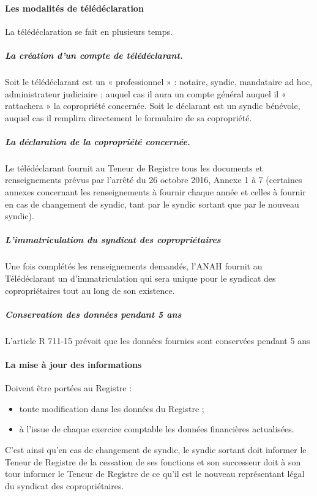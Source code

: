 			\paragraph{Les modalités de télédéclaration}
		
				La télédéclaration se fait en plusieurs temps.
				
				\subparagraph{La création d’un compte de télédéclarant.}
				Soit le télédéclarant est un « professionnel » : notaire, syndic, mandataire ad hoc, administrateur judiciaire ; auquel cas il aura un compte général auquel il « rattachera » la copropriété concernée.
				Soit le déclarant est un syndic bénévole, auquel cas il remplira directement le formulaire de sa copropriété.
				
				\subparagraph{La déclaration de la copropriété concernée.}
				Le télédéclarant fournit au Teneur de Registre tous les documents et renseignements prévus par l’arrêté du 26 octobre 2016, Annexe 1 à 7 (certaines annexes concernant les renseignements à fournir chaque année et celles à fournir en cas de changement de syndic, tant par le syndic sortant que par le nouveau syndic).
			
				\subparagraph{L’immatriculation du syndicat des copropriétaires}
				Une fois complétés les renseignements demandés, l’ANAH fournit au Télédéclarant un \no d’im\-ma\-triculation qui sera unique pour le syndicat des copropriétaires tout au long de son existence.
				
				\subparagraph{Conservation des données pendant 5 ans}
								L’article R 711-15 prévoit que les données fournies sont conservées pendant 5 ans
			
			\paragraph{La mise à jour des informations}
			
				Doivent être portées au Registre :
				\begin{itemize}
					\item toute modification dans les données du Registre ;
					\item à l’issue de chaque exercice comptable les données financières actualisées.
				\end{itemize}
			
				C’est ainsi qu’en cas de changement de syndic, le syndic sortant doit informer le Teneur de Registre de la cessation de ses fonctions et son successeur doit à son tour informer le Teneur de Registre de ce qu’il est le nouveau représentant légal du syndicat des copropriétaires.
				
